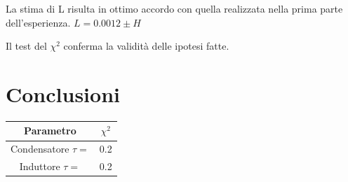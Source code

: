 La stima di L risulta in ottimo accordo con quella realizzata nella prima parte dell'esperienza.
$L=0.0012 \pm H $

Il test del $\chi^2$ conferma la validità delle ipotesi fatte.


\section{Conclusioni}


\begin{center}
\begin{tabular}{*{2}{c}}
Parametro & $\chi^2$ \\
\midrule
Condensatore $\tau =$ & 0.2 \\
Induttore $\tau =$ & 0.2 \\

\end{tabular}
\end{center}

